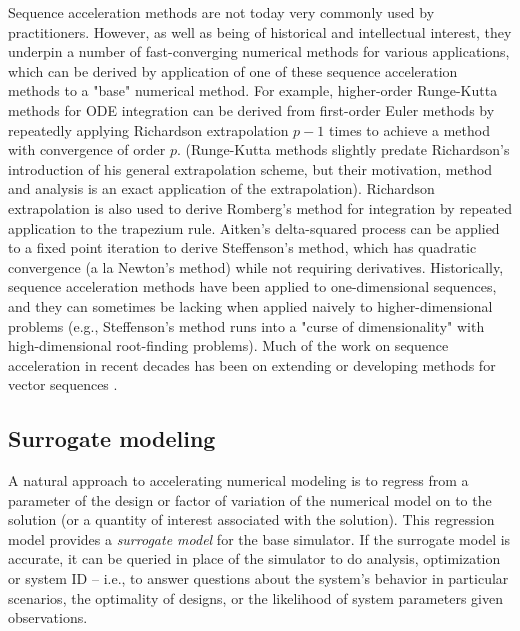 \documentclass{puthesis}
\begin{document}
Sequence acceleration methods are not today very commonly used by practitioners.
However, as well as being of historical and intellectual interest,
they underpin a number of fast-converging
numerical methods for various applications,
which can be derived by application of one of these
sequence acceleration methods to a "base" numerical method.
For example, higher-order Runge-Kutta methods for ODE integration can be derived from
first-order Euler methods by repeatedly applying Richardson extrapolation
$p-1$ times to achieve a method with convergence of order $p$.
(Runge-Kutta methods slightly predate Richardson's introduction of his general
extrapolation scheme, but their motivation, method and analysis is an exact application
of the extrapolation).
Richardson extrapolation is also used to derive Romberg's method for integration by repeated application to the trapezium rule.
Aitken's delta-squared process can be applied to a fixed point
iteration to derive Steffenson's method, which has quadratic convergence (a la Newton's method) while not requiring derivatives.
Historically, sequence acceleration methods have been applied to one-dimensional sequences,
and they can sometimes be lacking when applied naively to higher-dimensional problems (e.g., Steffenson's method runs into a "curse of dimensionality" with high-dimensional root-finding problems).
Much of the work on sequence acceleration in recent decades has
been on extending or developing methods for vector sequences \citep{osada1991acceleration}.


\subsection{Surrogate modeling}
A natural approach to accelerating numerical modeling is to regress from a parameter
of the design or factor of variation of the numerical model
on to the solution (or a quantity of interest associated with the solution).
This regression model provides a \emph{surrogate model} for the base simulator.
If the surrogate model is accurate, it can be queried in place of the simulator to
do analysis, optimization or system ID -- i.e., to answer questions about the
system's behavior in particular scenarios, the optimality of designs, or the
likelihood of system parameters given observations.
\end{document}
